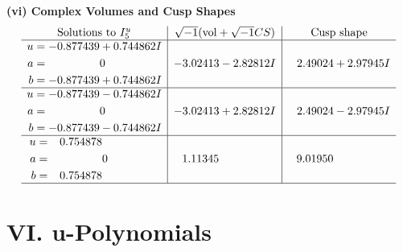 \documentclass[1p]{elsarticle_modified}
\theoremstyle{definition}
\newcommand{\I}{\sqrt{-1}}
\begin{document}
\newpage\flushleft \textbf{(vi) Complex Volumes and Cusp Shapes}
$$\begin{array}{c|c|c}  
\text{Solutions to }I^u_{5}& \I (\text{vol} + \sqrt{-1}CS) & \text{Cusp shape}\\
 \hline 
\begin{aligned}
u &= -0.877439 + 0.744862 I \\
a &= \phantom{-0.000000 } 0 \\
b &= -0.877439 + 0.744862 I\end{aligned}
 & -3.02413 - 2.82812 I & \phantom{-}2.49024 + 2.97945 I \\ \hline\begin{aligned}
u &= -0.877439 - 0.744862 I \\
a &= \phantom{-0.000000 } 0 \\
b &= -0.877439 - 0.744862 I\end{aligned}
 & -3.02413 + 2.82812 I & \phantom{-}2.49024 - 2.97945 I \\ \hline\begin{aligned}
u &= \phantom{-}0.754878\phantom{ +0.000000I} \\
a &= \phantom{-0.000000 } 0 \\
b &= \phantom{-}0.754878\phantom{ +0.000000I}\end{aligned}
 & \phantom{-}1.11345\phantom{ +0.000000I} & \phantom{-}9.01950\phantom{ +0.000000I}\\
 \hline 
 \end{array}$$\newpage
\newpage\renewcommand{\arraystretch}{1}
\centering \section*{ VI. u-Polynomials}
\end{document}
